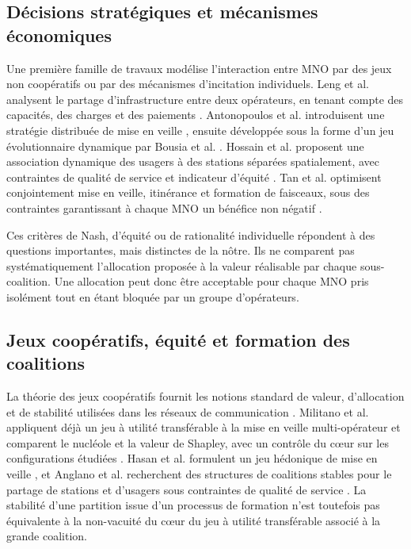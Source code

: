 \subsection{Décisions stratégiques et mécanismes économiques}

Une première famille de travaux modélise l'interaction entre MNO par des jeux
non coopératifs ou par des mécanismes d'incitation individuels. Leng et al.
analysent le partage d'infrastructure entre deux opérateurs, en tenant compte
des capacités, des charges et des paiements \cite{leng2014}. Antonopoulos et
al. introduisent une stratégie distribuée de mise en veille
\cite{antonopoulos2015}, ensuite développée sous la forme d'un jeu
évolutionnaire dynamique par Bousia et al. \cite{bousia2016}. Hossain et al.
proposent une association dynamique des usagers à des stations séparées
spatialement, avec contraintes de qualité de service et indicateur d'équité
\cite{hossain2019}. Tan et al. optimisent conjointement mise en veille,
itinérance et formation de faisceaux, sous des contraintes garantissant à
chaque MNO un bénéfice non négatif \cite{tan2023}.

Ces critères de Nash, d'équité ou de rationalité individuelle répondent à des
questions importantes, mais distinctes de la nôtre. Ils ne comparent pas
systématiquement l'allocation proposée à la valeur réalisable par chaque
sous-coalition. Une allocation peut donc être acceptable pour chaque MNO pris
isolément tout en étant bloquée par un groupe d'opérateurs.

\subsection{Jeux coopératifs, équité et formation des coalitions}

La théorie des jeux coopératifs fournit les notions standard de valeur,
d'allocation et de stabilité utilisées dans les réseaux de communication
\cite{saad2009}. Militano et al. appliquent déjà un jeu à utilité transférable
à la mise en veille multi-opérateur et comparent le nucléole et la valeur de
Shapley, avec un contrôle du cœur sur les configurations étudiées
\cite{militano2013}. Hasan et al. formulent un jeu hédonique de mise en veille
\cite{hasan2013}, et Anglano et al. recherchent des structures de coalitions
stables pour le partage de stations et d'usagers sous contraintes de qualité
de service \cite{anglano2014}. La stabilité d'une partition issue d'un
processus de formation n'est toutefois pas équivalente à la non-vacuité du
cœur du jeu à utilité transférable associé à la grande coalition.


